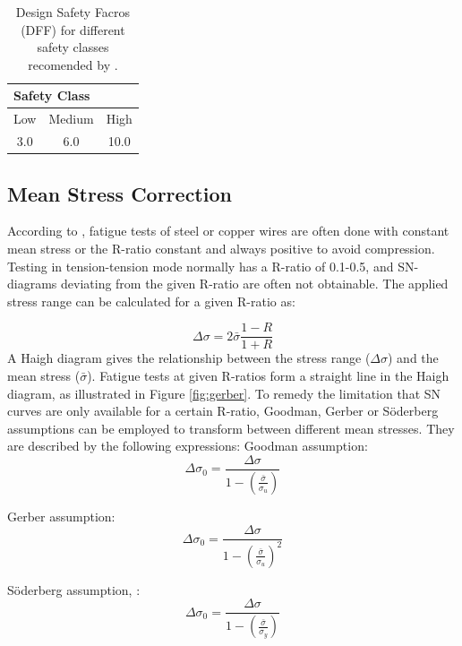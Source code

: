 \begin{table} [H]
\centering
\begin{tabular}{ |c|c|c|}
\hline
\multicolumn{3}{|l|}{\hspace{0.8cm}Safety Class}\\
 \hline
 \hline
Low & Medium & High \\
3.0 & 6.0 & 10.0\\
 \hline
\end{tabular}
\caption{Design Safety Facros (DFF) for different safety classes  recomended by \cite{riserfat}.}
\label{table:dff}
\end{table}
\subsection{Mean Stress Correction}
\label{sec:meanstress}
According to \cite{Savik2016}, fatigue tests of steel or copper wires are often done with constant mean stress or the R-ratio constant and always positive to avoid compression. Testing in tension-tension mode normally has a R-ratio of 0.1-0.5, and SN-diagrams deviating from the given R-ratio are often not obtainable.  The applied stress range can be calculated for a given R-ratio as:

\begin{equation}
    \Delta \sigma = 2 \bar{\sigma} \frac{1-R}{1+R}
\end{equation}
A Haigh diagram gives the relationship between the stress range ($\Delta \sigma$) and the mean stress ($\bar{\sigma}$).  Fatigue tests at given R-ratios form a straight line in the Haigh diagram, as illustrated in Figure \ref{fig:gerber}. To remedy the limitation that  SN curves are only available for a certain R-ratio, Goodman, Gerber or Söderberg assumptions can be employed to transform between different mean stresses. They are described by the following expressions:\newline
\newline
\noindent Goodman assumption:
\begin{equation}
    \Delta \sigma_0 = \frac{\Delta \sigma}{1-(\frac{\bar{\sigma}}{\sigma_u})}
\end{equation}

\noindent Gerber assumption:
\begin{equation}
    \Delta \sigma_0 = \frac{\Delta \sigma}{1-(\frac{\bar{\sigma}}{\sigma_u})^2}
\end{equation}

\noindent Söderberg assumption, \cite{fatiguehand}:
\begin{equation}
    \Delta \sigma_0 = \frac{\Delta \sigma}{1-(\frac{\bar{\sigma}}{\sigma_y})}
\end{equation}

